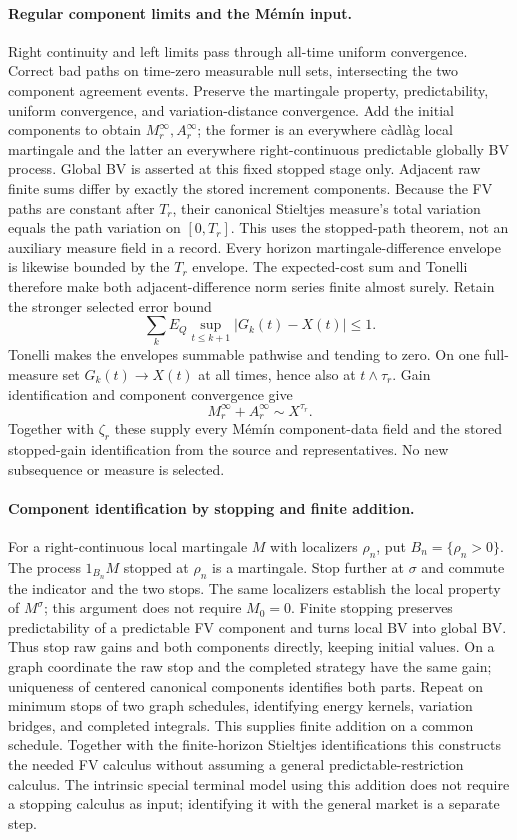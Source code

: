 \paragraph{Regular component limits and the Mémín input.}
Right continuity and left limits pass through all-time uniform convergence.
Correct bad paths on time-zero measurable null sets, intersecting the two
component agreement events. Preserve the martingale property, predictability,
uniform convergence, and variation-distance convergence.
Add the initial components to obtain $M_r^\infty,A_r^\infty$; the former is
an everywhere c\`adl\`ag local martingale and the latter an everywhere
right-continuous predictable globally BV process. Global BV is asserted at
this fixed stopped stage only.
Adjacent raw finite sums differ by exactly the stored increment components.
Because the FV paths are constant after $T_r$, their canonical Stieltjes
measure's total variation equals the path variation on $[0,T_r]$.
This uses the stopped-path theorem, not an auxiliary measure field in a record.
Every horizon martingale-difference envelope is likewise bounded by the
$T_r$ envelope. The expected-cost sum and Tonelli therefore make both
adjacent-difference norm series finite almost surely.
Retain the stronger selected error bound
\[
 \sum_kE_Q\sup_{t\leq k+1}|G_k(t)-X(t)|\leq1.
\]
Tonelli makes the envelopes summable pathwise and tending to zero.
On one full-measure set $G_k(t)\to X(t)$ at all times, hence also at
$t\wedge\tau_r$. Gain identification and component convergence give
\[
 M_r^\infty+A_r^\infty\sim X^{\tau_r}.
\]
Together with $\zeta_r$ these supply every Mémín component-data field and
the stored stopped-gain identification from the source and representatives.
No new subsequence or measure is selected.

\paragraph{Component identification by stopping and finite addition.}
For a right-continuous local martingale $M$ with localizers $\rho_n$, put
$B_n=\{\rho_n>0\}$. The process $1_{B_n}M$ stopped at $\rho_n$ is a
martingale. Stop further at $\sigma$ and commute the indicator and the two
stops. The same localizers establish the local property of $M^\sigma$;
this argument does not require $M_0=0$.
Finite stopping preserves predictability of a predictable FV component and
turns local BV into global BV. Thus stop raw gains and both components
directly, keeping initial values. On a graph coordinate the raw stop and
the completed strategy have the same gain; uniqueness of centered canonical
components identifies both parts. Repeat on minimum stops of two graph
schedules, identifying energy kernels, variation bridges, and completed
integrals. This supplies finite addition on a common schedule.
Together with the finite-horizon Stieltjes identifications this constructs
the needed FV calculus without assuming a general predictable-restriction
calculus. The intrinsic special terminal model using this addition does not
require a stopping calculus as input; identifying it with the general market
is a separate step.

